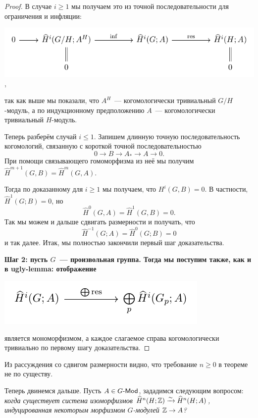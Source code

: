\begin{proof}
		В случае $i \ge 1$ мы получаем это из точной последовательности для ограничения и инфляции: 

		\begin{center}
	       \includegraphics{lectures/6/pictures/cd_35.pdf},
		\end{center}
		так как выше мы показали, что $A^H$~--- когомологически тривиальный $G/H$-модуль, а по индукционному предположению $A$~--- когомологически тривиальный $H$-модуль. 


	Теперь разберём случай  $i \le 1$. Запишем длинную точную последовательность когомологий, связанную с короткой точной последовательностью 
	\[
		0 \to B \to A_* \to A \to 0.
	\]
	При помощи связывающего гомоморфизма из неё мы получим $\widehat{H}^{m + 1}(G, B) = \widehat{H}^m(G, A)$.

	Тогда по доказанному для $i \ge 1$ мы получаем, что $H^{i}(G, B) = 0$. В частности, $\widehat{H}^1(G; B) = 0$, но 
	\[
		\widehat{H}^0(G, A) = \widehat{H}^1(G, B) = 0.
	\]
	Так мы можем и дальше сдвигать размерности и получать, что 
	\[
		\widehat{H}^{-1}(G; A) = \widehat{H}^0(G; B) = 0
	\]
	и так далее. Итак, мы полностью закончили первый шаг доказательства. 

	\noindent\bf{Шаг 2:} пусть $G$~--- произвольная группа. Тогда мы поступим также, как и в ugly-lemma: отображение
	\begin{center}
			\includegraphics{lectures/6/pictures/cd_36.pdf}
	\end{center}
	является мономорфизмом, а каждое слагаемое справа когомологически тривиально по первому шагу доказательства. 
	\end{proof}

	\begin{remark}
		Из рассуждения со сдвигом размерности видно, что требование $n \ge 0$ в теореме не по существу. 
	\end{remark}

    Теперь двинемся дальше. Пусть $A \in G\text{-}\mathsf{Mod}$, зададимся следующим вопросом: \emph{когда существует система изоморфизмов $\widehat{H}^n(H; \mathbb{Z}) \xrightarrow{\sim} \widehat{H}^n(H; A)$, индуцированная некоторым морфизмом $G$-модулей $\mathbb{Z} \to A$?}

